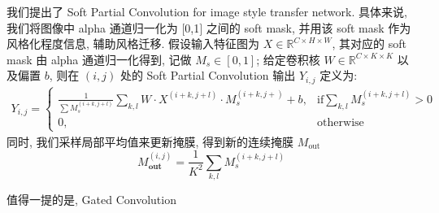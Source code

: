 我们提出了 Soft Partial Convolution for image style transfer network. 具体来说, 我们将图像中 alpha 通道归一化为 $[$0,1$]$ 之间的 soft mask, 并用该 soft mask 作为风格化程度信息, 辅助风格迁移. 假设输入特征图为 $X \in \mathbb{R}^{C\times H \times W}$, 其对应的 soft mask 由 alpha 通道归一化得到, 记做 $M_{s}\in [\mathrm{0},\mathrm{1}]$; 给定卷积核 $W \in \mathbb{R}^{C\times K \times K}$ 以及偏置 $b$, 则在 $(i,j)$ 处的 Soft Partial Convolution 输出 $Y_{i,j}$ 定义为:
\begin{equation}
    \begin{aligned}
        \label{equation-soft_partial_convolution}
        Y_{i,j} = \begin{cases}
            \frac{1}{\sum M_s^{(i+k,j+l)}} \sum_{k,l} W \cdot X^{(i+k, j+l)} \cdot M_{s}^{(i+k, j+)} + b,& \mathrm{if} \sum_{k,l} M_{s}^{(i+k, j+l)} > 0 \\
            0, & \mathrm{otherwise}
        \end{cases}
    \end{aligned}
\end{equation}
同时, 我们采样局部平均值来更新掩膜, 得到新的连续掩膜 $M_{\mathrm{out}}$
\begin{equation}
    \label{equation-mask_update}
    M_{\mathbf{out}}^{(i,j)} = \frac{1}{K^2}\sum_{k,l} M_{s}^{(i+k, j+l)} 
\end{equation}

值得一提的是, Gated Convolution 